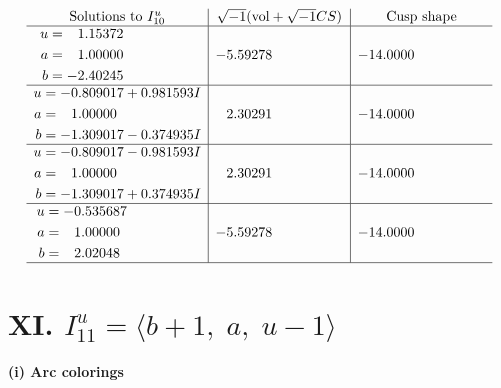 \documentclass[1p]{elsarticle_modified}
\theoremstyle{definition}
\newcommand{\I}{\sqrt{-1}}
\begin{document}
$$\begin{array}{c|c|c}  
\text{Solutions to }I^u_{10}& \I (\text{vol} + \sqrt{-1}CS) & \text{Cusp shape}\\
 \hline 
\begin{aligned}
u &= \phantom{-}1.15372\phantom{ +0.000000I} \\
a &= \phantom{-}1.00000\phantom{ +0.000000I} \\
b &= -2.40245\phantom{ +0.000000I}\end{aligned}
 & -5.59278\phantom{ +0.000000I} & -14.0000\phantom{ +0.000000I} \\ \hline\begin{aligned}
u &= -0.809017 + 0.981593 I \\
a &= \phantom{-}1.00000\phantom{ +0.000000I} \\
b &= -1.309017 - 0.374935 I\end{aligned}
 & \phantom{-}2.30291\phantom{ +0.000000I} & -14.0000\phantom{ +0.000000I} \\ \hline\begin{aligned}
u &= -0.809017 - 0.981593 I \\
a &= \phantom{-}1.00000\phantom{ +0.000000I} \\
b &= -1.309017 + 0.374935 I\end{aligned}
 & \phantom{-}2.30291\phantom{ +0.000000I} & -14.0000\phantom{ +0.000000I} \\ \hline\begin{aligned}
u &= -0.535687\phantom{ +0.000000I} \\
a &= \phantom{-}1.00000\phantom{ +0.000000I} \\
b &= \phantom{-}2.02048\phantom{ +0.000000I}\end{aligned}
 & -5.59278\phantom{ +0.000000I} & -14.0000\phantom{ +0.000000I}\\
 \hline 
 \end{array}$$\newpage\newpage\renewcommand{\arraystretch}{1}
\centering \section*{XI. $I^u_{11}= \langle b+1,\;a,\;u-1 \rangle$}
\flushleft \textbf{(i) Arc colorings}\\
\end{document}
